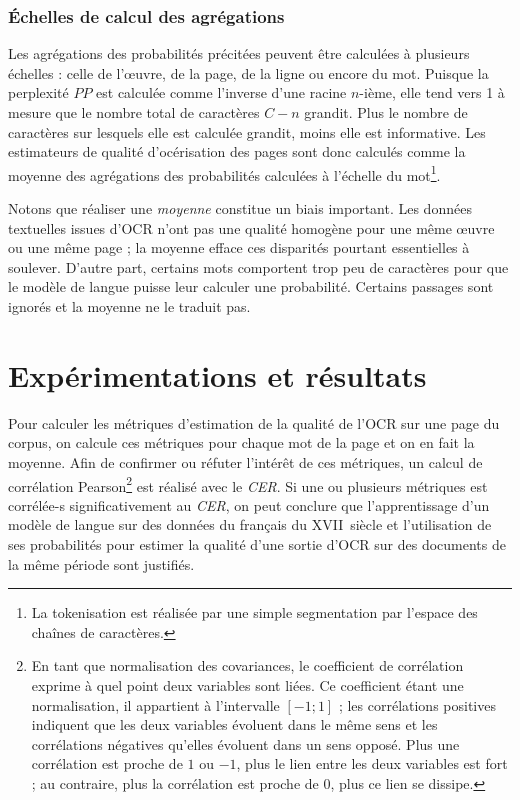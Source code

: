 \documentclass[10pt,twoside]{article}
\begin{document}
	    \subsubsection{\'{E}chelles de calcul des agrégations}\label{echelle}
	    Les agrégations des probabilités précitées peuvent être calculées à plusieurs échelles : celle de l'\oe{}uvre, de la page, de la ligne 
	    ou encore du mot. Puisque la perplexité $PP$ est calculée comme l'inverse d'une racine $n$-ième, elle tend vers 1 à mesure que le nombre 
	    total de caractères $C - n$ grandit. Plus le nombre de caractères sur lesquels elle est calculée grandit, moins elle est informative. 
	    Les estimateurs de qualité d'océrisation des pages sont donc calculés comme la moyenne des agrégations des probabilités
	    calculées à l'échelle du mot\footnote{La tokenisation est réalisée par une simple segmentation par l'espace des chaînes de caractères.}.

	    Notons que réaliser une \textit{moyenne} constitue un biais important. Les données textuelles issues d'OCR n'ont pas une qualité homogène
	    pour une même \oe{}uvre ou une même page ; la moyenne efface ces disparités pourtant essentielles à soulever. D'autre
	    part, certains mots comportent trop peu de caractères pour que le modèle de langue puisse leur calculer une probabilité. Certains passages sont 
	    ignorés et la moyenne ne le traduit pas. 


\section{Expérimentations et résultats}\label{expe}

Pour calculer les métriques d'estimation de la qualité de l'OCR sur une page du corpus, on calcule ces métriques pour chaque mot de la page
et on en fait la moyenne. Afin de confirmer ou réfuter l'intérêt de ces métriques, un calcul de corrélation 
Pearson\footnote{En tant que normalisation des covariances, le coefficient de corrélation exprime à quel point deux variables 
sont liées. Ce coefficient étant une normalisation, il appartient à l'intervalle $\left[-1;1\right]$ ; les corrélations 
positives indiquent que les deux variables évoluent dans le même sens et les corrélations négatives qu'elles évoluent dans un sens opposé. 
Plus une corrélation est proche de $1$ ou $-1$, plus le lien entre les deux variables est fort ; au
contraire, plus la corrélation est proche de $0$, plus ce lien se dissipe.}  
est réalisé avec le \textit{CER}. Si une ou plusieurs métriques est corrélée-s significativement au \textit{CER}, on peut
conclure que l'apprentissage d'un modèle de langue sur des données du français du XVII\ieme~siècle et l'utilisation de ses 
probabilités pour estimer la qualité d'une sortie d'OCR sur des documents de la même période sont justifiés.
\end{document}
